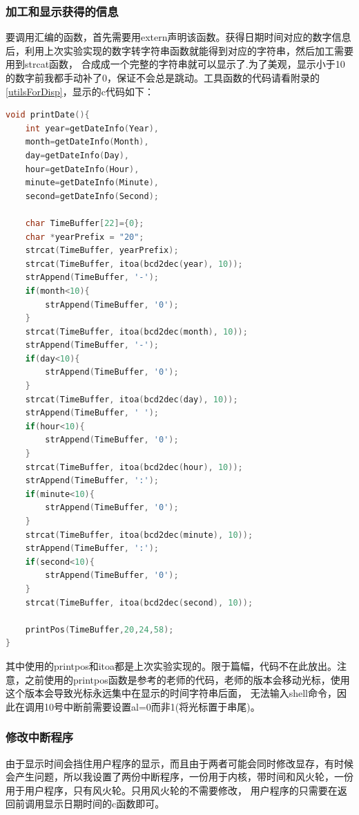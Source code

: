 \documentclass[a4paper, 11pt]{article} %
\begin{document}
\subsubsection{加工和显示获得的信息}
要调用汇编的函数，首先需要用extern声明该函数。获得日期时间对应的数字信息后，利用上次实验实现的数字转字符串函数就能得到对应的字符串，然后加工需要用到strcat函数，
合成成一个完整的字符串就可以显示了.为了美观，显示小于10的数字前我都手动补了0，保证不会总是跳动。工具函数的代码请看附录的\ref{utilsForDisp}，显示的c代码如下：
\begin{lstlisting}[language={c},label=split,caption=split]
  void printDate(){
    int year=getDateInfo(Year),
    month=getDateInfo(Month),
    day=getDateInfo(Day),
    hour=getDateInfo(Hour),
    minute=getDateInfo(Minute),
    second=getDateInfo(Second);

    char TimeBuffer[22]={0};
    char *yearPrefix = "20";
    strcat(TimeBuffer, yearPrefix);
    strcat(TimeBuffer, itoa(bcd2dec(year), 10));
    strAppend(TimeBuffer, '-');
    if(month<10){
        strAppend(TimeBuffer, '0');
    }
    strcat(TimeBuffer, itoa(bcd2dec(month), 10));
    strAppend(TimeBuffer, '-');
    if(day<10){
        strAppend(TimeBuffer, '0');
    }
    strcat(TimeBuffer, itoa(bcd2dec(day), 10));
    strAppend(TimeBuffer, ' ');
    if(hour<10){
        strAppend(TimeBuffer, '0');
    }
    strcat(TimeBuffer, itoa(bcd2dec(hour), 10));
    strAppend(TimeBuffer, ':');
    if(minute<10){
        strAppend(TimeBuffer, '0');
    }
    strcat(TimeBuffer, itoa(bcd2dec(minute), 10));
    strAppend(TimeBuffer, ':');
    if(second<10){
        strAppend(TimeBuffer, '0');
    }
    strcat(TimeBuffer, itoa(bcd2dec(second), 10));

    printPos(TimeBuffer,20,24,58);
}
\end{lstlisting}
其中使用的printpos和itoa都是上次实验实现的。限于篇幅，代码不在此放出。注意，之前使用的printpos函数是参考的老师的代码，老师的版本会移动光标，使用这个版本会导致光标永远集中在显示的时间字符串后面，
无法输入shell命令，因此在调用10号中断前需要设置al=0而非1(将光标置于串尾)。

\subsubsection{修改中断程序}
由于显示时间会挡住用户程序的显示，而且由于两者可能会同时修改显存，有时候会产生问题，所以我设置了两份中断程序，一份用于内核，带时间和风火轮，一份用于用户程序，只有风火轮。只用风火轮的不需要修改，
用户程序的只需要在返回前调用显示日期时间的c函数即可。
\end{document}

